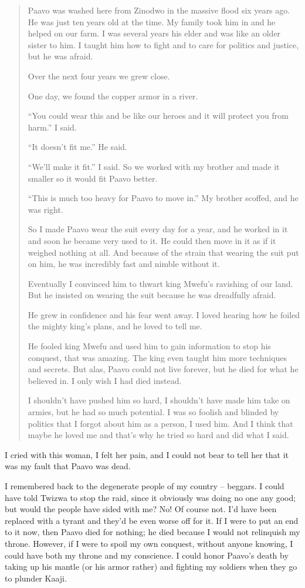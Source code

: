 \begin{quote}
Paavo was washed here from Zinodwo in the massive flood six years ago. He was just ten years old at the time. My family took him in and he helped on our farm. I was several years his elder and was like an older sister to him. I taught him how to fight and to care for politics and justice, but he was afraid.

Over the next four years we grew close.

One day, we found the copper armor in a river.

``You could wear this and be like our heroes and it will protect you from harm.'' I said.

``It doesn't fit me.'' He said.

``We'll make it fit.'' I said. So we worked with my brother and made it smaller so it would fit Paavo better.

``This is much too heavy for Paavo to move in.'' My brother scoffed, and he was right.

So I made Paavo wear the suit every day for a year, and he worked in it and soon he became very used to it. He could then move in it as if it weighed nothing at all. And because of the strain that wearing the suit put on him, he was incredibly fast and nimble without it.

Eventually I convinced him to thwart king Mwefu's ravishing of our land. But he insisted on wearing the suit because he was dreadfully afraid.

He grew in confidence and his fear went away. I loved hearing how he foiled the mighty king's plans, and he loved to tell me.

He fooled king Mwefu and used him to gain information to stop his conquest, that was amazing. The king even taught him more techniques and secrets. But alas, Paavo could not live forever, but he died for what he believed in. I only wish I had died instead.

I shouldn't have pushed him so hard, I shouldn't have made him take on armies, but he had so much potential. I was so foolish and blinded by politics that I forgot about him as a person, I used him. And I think that maybe he loved me and that's why he tried so hard and did what I said.

\end{quote}

I cried with this woman, I felt her pain, and I could not bear to tell her that it was my fault that Paavo was dead.

I remembered back to the degenerate people of my country -- beggars. I could have told Twizwa to stop the raid, since it obviously was doing no one any good; but would the people have sided with me? No! Of course not. I'd have been replaced with a tyrant and they'd be even worse off for it. If I were to put an end to it now, then Paavo died for nothing; he died because I would not relinquish my throne. However, if I were to spoil my own conquest, without anyone knowing, I could have both my throne and my conscience. I could honor Paavo's death by taking up his mantle (or his armor rather) and fighting my soldiers when they go to plunder Kaaji.

